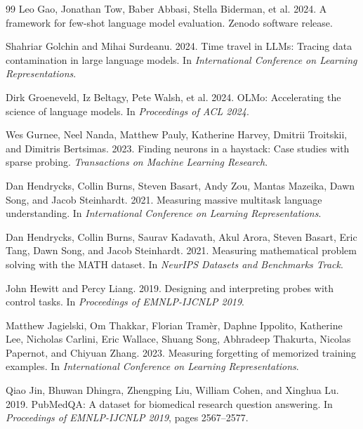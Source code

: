 \documentclass[10pt,twocolumn,letterpaper]{article}
\begin{document}
\begin{thebibliography}{99}
Leo Gao, Jonathan Tow, Baber Abbasi, Stella Biderman, et al. 2024.
A framework for few-shot language model evaluation.
Zenodo software release.

Shahriar Golchin and Mihai Surdeanu. 2024.
Time travel in LLMs: Tracing data contamination in large language models.
In \emph{International Conference on Learning Representations}.

Dirk Groeneveld, Iz Beltagy, Pete Walsh, et al. 2024.
OLMo: Accelerating the science of language models.
In \emph{Proceedings of ACL 2024}.

Wes Gurnee, Neel Nanda, Matthew Pauly, Katherine Harvey, Dmitrii Troitskii, and Dimitris Bertsimas. 2023.
Finding neurons in a haystack: Case studies with sparse probing.
\emph{Transactions on Machine Learning Research}.

Dan Hendrycks, Collin Burns, Steven Basart, Andy Zou, Mantas Mazeika, Dawn Song, and Jacob Steinhardt. 2021.
Measuring massive multitask language understanding.
In \emph{International Conference on Learning Representations}.

Dan Hendrycks, Collin Burns, Saurav Kadavath, Akul Arora, Steven Basart, Eric Tang, Dawn Song, and Jacob Steinhardt. 2021.
Measuring mathematical problem solving with the MATH dataset.
In \emph{NeurIPS Datasets and Benchmarks Track}.

John Hewitt and Percy Liang. 2019.
Designing and interpreting probes with control tasks.
In \emph{Proceedings of EMNLP-IJCNLP 2019}.

Matthew Jagielski, Om Thakkar, Florian Tram\`er, Daphne Ippolito, Katherine Lee, Nicholas Carlini, Eric Wallace, Shuang Song, Abhradeep Thakurta, Nicolas Papernot, and Chiyuan Zhang. 2023.
Measuring forgetting of memorized training examples.
In \emph{International Conference on Learning Representations}.

Qiao Jin, Bhuwan Dhingra, Zhengping Liu, William Cohen, and Xinghua Lu. 2019.
PubMedQA: A dataset for biomedical research question answering.
In \emph{Proceedings of EMNLP-IJCNLP 2019}, pages 2567--2577.


\end{thebibliography}
\end{document}
